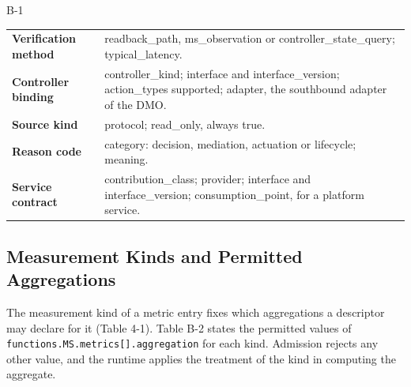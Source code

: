 \begin{wptable}{B-1}
\begin{longtable}[]{@{}
  >{\raggedright\arraybackslash}p{}
  >{\raggedright\arraybackslash}p{}@{}}
\textbf{Verification method} & readback\_\allowbreak{}path,
ms\_\allowbreak{}observation or
controller\_\allowbreak{}state\_\allowbreak{}query;
typical\_\allowbreak{}latency.\allowbreak{} \\
\textbf{Controller binding} & controller\_\allowbreak{}kind; interface
and interface\_\allowbreak{}version; action\_\allowbreak{}types
supported; adapter, the southbound adapter of the DMO. \\
\textbf{Source kind} & protocol; read\_\allowbreak{}only, always
true. \\
\textbf{Reason code} & category: decision, mediation, actuation or
lifecycle; meaning. \\
\textbf{Service contract} & contribution\_\allowbreak{}class; provider;
interface and interface\_\allowbreak{}version;
consumption\_\allowbreak{}point, for a platform service. \\
\end{longtable}

\end{wptable}

\hypertarget{b.2-measurement-kinds-and-permitted-aggregations}{%
\subsection{Measurement Kinds and Permitted Aggregations}\label{b.2-measurement-kinds-and-permitted-aggregations}}

The measurement kind of a metric entry fixes which aggregations a
descriptor may declare for it (Table 4-1). Table B-2 states the
permitted values of \texttt{functions.MS.metrics{[}{]}.aggregation} for
each kind. Admission rejects any other value, and the runtime applies
the treatment of the kind in computing the aggregate.


